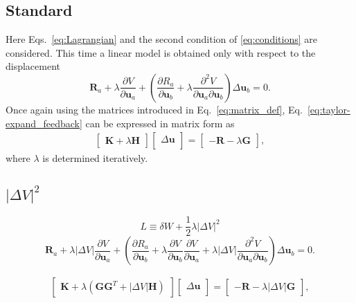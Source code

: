 \documentclass[12pt,aps,pre]{revtex4}
\begin{document}
\subsection{Standard}
Here Eqs.\ \eqref{eq:Lagrangian} and the second condition of \eqref{eq:conditions} are considered. This time a linear model is obtained only with respect to the displacement
%
\begin{equation}
\pmb{R}_a + \lambda \frac{\partial V}{\partial \pmb{u}_a} 
%
+ \left(\frac{\partial R_a}{\partial \pmb{u}_b} + \lambda \frac{\partial^2 V}{\partial \pmb{u}_a \partial \pmb{u}_b}  \right) \Delta \pmb{u}_b  =0.
\label{eq:taylor-expand_feedback}
\end{equation}
%
Once again using the matrices introduced in Eq.\ \eqref{eq:matrix_def}, Eq.\ \eqref{eq:taylor-expand_feedback} can be expressed in matrix form as
%
\begin{eqnarray}
\begin{bmatrix}
\textbf{K} + \lambda \textbf{H} 
\end{bmatrix}
%
\begin{bmatrix}
\Delta \textbf{u} \\
\end{bmatrix}
%
= \begin{bmatrix}
-\textbf{R}-\lambda \textbf{G} 
\end{bmatrix},
\label{eq:taylor-expand_matrix_feedback}
\end{eqnarray}
%
where $\lambda$ is determined iteratively.

\subsection{$|\Delta V|^2$ }
%
\begin{equation}
L \equiv \delta W + \frac{1}{2}\lambda |\Delta V|^2
\label{eq:squared_Lagrangian}
\end{equation}
%
%
\begin{equation}
\pmb{R}_a + \lambda  |\Delta V| \frac{\partial V}{\partial \pmb{u}_a}
%
+ \left(\frac{\partial R_a}{\partial \pmb{u}_b} + \lambda \frac{\partial V}{\partial \pmb{u}_b} \frac{\partial V}{\partial \pmb{u}_a} + \lambda |\Delta V| \frac{\partial^2 V}{\partial \pmb{u}_a \partial \pmb{u}_b} \right) \Delta \pmb{u}_b  =0.
\label{eq:squared_taylor-expand_feedback}
\end{equation}
%

%
\begin{eqnarray}
\begin{bmatrix}
\textbf{K} + \lambda \left(\textbf{G} \textbf{G}^T + |\Delta V| \textbf{H} \right) 
\end{bmatrix}
%
\begin{bmatrix}
\Delta \textbf{u} \\
\end{bmatrix}
%
= \begin{bmatrix}
-\textbf{R}-\lambda|\Delta V| \textbf{G}
\end{bmatrix},
\label{eq:squared_taylor-expand_matrix_feedback}
\end{eqnarray}
%
\end{document}
